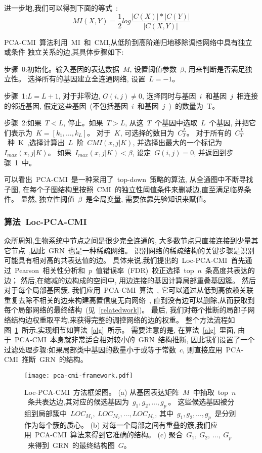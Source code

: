 进一步地,我们可以得到下面的等式~\cite{zhang2011inferring}:
\begin{equation}
    MI(X,Y)=\frac{1}{2}log\frac{|C(X)|*|C(Y)|}{|C(X,Y)|}
\end{equation}

PCA-CMI~算法利用~MI~和~CMI,从低阶到高阶递归地移除调控网络中具有独立或条件
独立关系的边,其具体步骤如下:

步骤~0:初始化。输入基因的表达数据~$M$, 设置阈值参数~$\beta$, 用来判断是否满足独立性。
选择所有的基因建立全连通网络, 设置~$L=-1$。

步骤~1:$L=L+1$, 对于非零边, $G(i,j) \neq 0$, 选择同时与基因~$i$~和基因~$j$~相连接的邻近基因, 
假定这些基因~(不包括基因~$i$~和基因~$j$~)~的数量为~T。

步骤~2:如果~$T<L$, 停止。如果~$T>L$, 从这~$T$~个基因中选取~$L$~个基因, 
并把它们表示为~$K=[k_1,\ldots,k_L]$。
对于~$K$, 可选择的数目为~$C_T^L$。
对于所有的~$C_T^L$~种~K~,选择计算出~$L$~阶~$CMI(x,j|K)$,
并选择出最大的一个标记为~$I_{max}(x,j|K)$。
如果~$I_{max}(x,j|K) < \beta$, 设定~$G(i,j)=0$, 并返回到步骤~1~中。

可以看出~PCA-CMI~是一种采用了~top-down~策略的算法, 
从全通图中不断寻找子图, 在每个子图结构里按照~CMI~的独立性阈值条件来删减边,直至满足临界条件。
显然, 独立性阈值~$\beta$~是全局变量, 
需要依靠先验知识来赋值。

\subsubsection{算法~Loc-PCA-CMI}

众所周知,生物系统中节点之间是很少完全连通的,
大多数节点只直接连接到少量其它节点~\cite{jeong2000large},因此~GRN~也是一种稀疏网络。
识别网络的稀疏结构的关键步骤是识别可能具有相对高的共表达值的边。
具体来说,我们提出的~Loc-PCA-CMI~首先通过~Pearson~相关性分析和~$p$~值错误率~(FDR)~校正选择~top~$n$~条高度共表达的边；
然后,在缩减的边构成的空间中, 用边连接的基因计算局部重叠基因簇。
然后对于每个局部基因簇, 我们应用~PCA-CMI~算法~\cite{zhang2011inferring},
它可以通过从低到高依赖关联重复去除不相关的边来构建高置信度无向网络~\cite{spirtes2000causation},
直到没有边可以删除,从而获取到每个局部网络的最终结构~(见~\ref{relatedwork})。
最后, 我们对每个推断的局部子网络结构边权重取平均,来获得完整的调控网络的边的权重。
整个方法流程如图~\ref{pca-cmi-fr}~所示,实现细节如算法~\ref{alg}~所示。
需要注意的是,
在算法~\ref{alg}~里面,
由于~PCA-CMI~本身就非常适合相对较小的~GRN~结构推断,
因此我们设置了一个过滤处理步骤:如果局部类中基因的数量小于或等于常数~$c$,
则直接应用~PCA-CMI~推断~GRN~的结构。
\begin{figure}[!htbp]
    \centering
    \texttt{[image: pca-cmi-framework.pdf]}
    \caption{Loc-PCA-CMI~方法框架图。
    (a) 从基因表达矩阵~$M$~中抽取~top~$n$~条共表达边,其对应的候选基因为~$g_1,g_2,\ldots,g_{p}~$。
    这些候选基因被分组到局部簇中~$LOC_{M_1},~LOC_{M_2},\ldots,LOC_{M_{p}}$,
    其中~$g_1,g_2,\ldots,g_{p}$~是分别作为每个簇的质心。
    (b) 对每一个局部之间有重叠的簇,我们应用~PCA-CMI~算法来得到它准确的结构。
    (c) 聚合~$G_1,~G_2,~\ldots,~G_p$~来得到~GRN~的最终结构图~$G$。
    }
    \label{pca-cmi-fr}
\end{figure}

